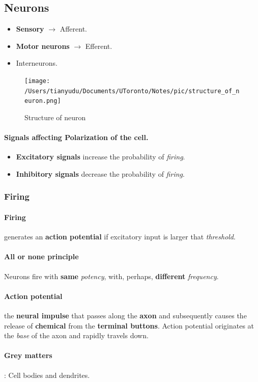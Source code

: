 \documentclass{article}
\begin{document}
	\subsection{Neurons}
	\begin{itemize}
		\item \textbf{Sensory} $\rightarrow$ Afferent.
		\item \textbf{Motor neurons} $\rightarrow$ Efferent.
		\item Interneurons.
	\end{itemize}
	\begin{figure}
		\texttt{[image: /Users/tianyudu/Documents/UToronto/Notes/pic/structure\_of\_neuron.png]}
		\caption{Structure of neuron}
	\end{figure}
	\paragraph{Signals affecting Polarization of the cell.}
	\begin{itemize}
		\item \textbf{Excitatory signals} increase the probability of \emph{firing}.
		\item \textbf{Inhibitory signals} decrease the probability of \emph{firing}.
	\end{itemize}
	\subsubsection{Firing}
	\paragraph{Firing} generates an \textbf{action potential} if excitatory input is larger that \emph{threshold}.
	\paragraph{All or none principle} Neurons fire with \textbf{same} \emph{potency}, with, perhaps, \textbf{different} \emph{frequency}.
	\paragraph{Action potential} the \textbf{neural impulse} that passes along the \textbf{axon} and subsequently causes the release of \textbf{chemical} from the \textbf{terminal buttons}. Action potential originates at the \emph{base} of the axon and rapidly travels down.
	\paragraph{Grey matters}: Cell bodies and dendrites.
\end{document}
